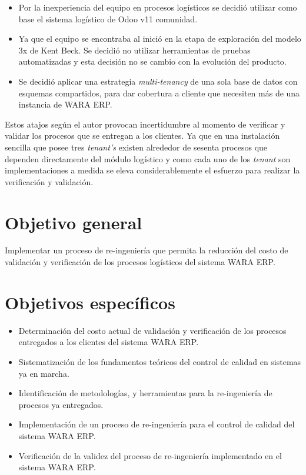 \begin{itemize}
    \item Por la inexperiencia del equipo en procesos logísticos se decidió utilizar como base el sistema logístico de Odoo v11 comunidad.
    \item Ya que el equipo se encontraba al inició en la etapa de exploración del modelo 3x de Kent Beck. Se decidió no utilizar herramientas de pruebas automatizadas y esta decisión no se cambio con la evolución del producto.
    \item Se decidió aplicar una estrategia \textit{multi-tenancy} de una sola base de datos con esquemas compartidos, para dar cobertura a cliente que necesiten más de una instancia de WARA ERP.
\end{itemize}

\noindent
Estos atajos según el autor provocan incertidumbre al momento de verificar y validar los procesos que se entregan a los clientes. Ya que en una instalación sencilla que posee tres \textit{tenant's} existen alrededor de sesenta procesos que dependen directamente del módulo logístico y como cada uno de los \textit{tenant} son implementaciones a medida se eleva considerablemente el esfuerzo para realizar la verificación y validación. 

\section*{Objetivo general}
\noindent
Implementar un proceso de re-ingeniería que permita la reducción del costo de validación y verificación de los procesos logísticos del sistema WARA ERP.

\section*{Objetivos específicos}
\begin{itemize}
    \item Determinación del costo actual de validación y verificación de los procesos entregados a los clientes del sistema WARA ERP.
    
    \item Sistematización de los fundamentos teóricos del control de calidad en sistemas ya en marcha.
    
    \item Identificación de metodologías, y herramientas para la re-ingeniería de procesos ya entregados.
    
    \item Implementación de un proceso de re-ingeniería para el control de calidad del sistema WARA ERP. 
    
    \item Verificación de la validez del proceso de re-ingeniería implementado en el sistema WARA ERP.
\end{itemize}

